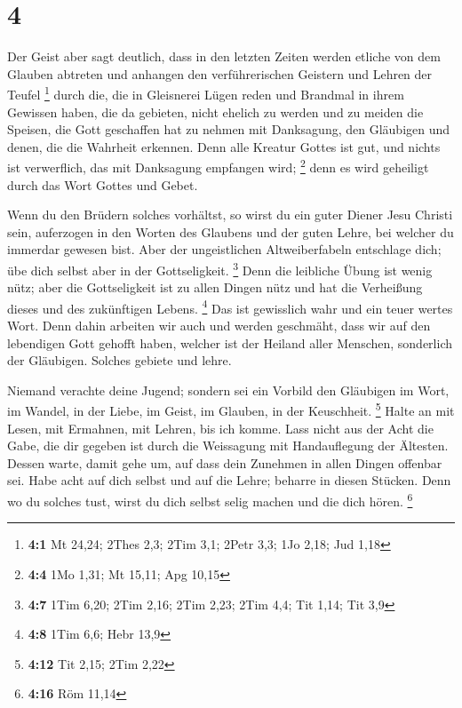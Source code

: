 \hypertarget{section-3}{%
\section{4}\label{section-3}}

 Der Geist aber sagt deutlich, dass in den letzten Zeiten
werden etliche von dem Glauben abtreten und anhangen den verführerischen
Geistern und Lehren der Teufel \footnote{\textbf{4:1} Mt 24,24; 2Thes
  2,3; 2Tim 3,1; 2Petr 3,3; 1Jo 2,18; Jud 1,18}  durch
die, die in Gleisnerei Lügen reden und Brandmal in ihrem Gewissen haben,
 die da gebieten, nicht ehelich zu werden und zu meiden
die Speisen, die Gott geschaffen hat zu nehmen mit Danksagung, den
Gläubigen und denen, die die Wahrheit erkennen.  Denn alle
Kreatur Gottes ist gut, und nichts ist verwerflich, das mit Danksagung
empfangen wird; \footnote{\textbf{4:4} 1Mo 1,31; Mt 15,11; Apg 10,15}
 denn es wird geheiligt durch das Wort Gottes und Gebet.

 Wenn du den Brüdern solches vorhältst, so wirst du ein
guter Diener Jesu Christi sein, auferzogen in den Worten des Glaubens
und der guten Lehre, bei welcher du immerdar gewesen bist.
 Aber der ungeistlichen Altweiberfabeln entschlage dich;
übe dich selbst aber in der Gottseligkeit. \footnote{\textbf{4:7} 1Tim
  6,20; 2Tim 2,16; 2Tim 2,23; 2Tim 4,4; Tit 1,14; Tit 3,9}
 Denn die leibliche Übung ist wenig nütz; aber die
Gottseligkeit ist zu allen Dingen nütz und hat die Verheißung dieses und
des zukünftigen Lebens. \footnote{\textbf{4:8} 1Tim 6,6; Hebr 13,9}
 Das ist gewisslich wahr und ein teuer wertes Wort.
 Denn dahin arbeiten wir auch und werden geschmäht, dass
wir auf den lebendigen Gott gehofft haben, welcher ist der Heiland aller
Menschen, sonderlich der Gläubigen.  Solches gebiete und
lehre.

 Niemand verachte deine Jugend; sondern sei ein Vorbild
den Gläubigen im Wort, im Wandel, in der Liebe, im Geist, im Glauben, in
der Keuschheit. \footnote{\textbf{4:12} Tit 2,15; 2Tim 2,22}
 Halte an mit Lesen, mit Ermahnen, mit Lehren, bis ich
komme.  Lass nicht aus der Acht die Gabe, die dir gegeben
ist durch die Weissagung mit Handauflegung der Ältesten. 
Dessen warte, damit gehe um, auf dass dein Zunehmen in allen Dingen
offenbar sei.  Habe acht auf dich selbst und auf die
Lehre; beharre in diesen Stücken. Denn wo du solches tust, wirst du dich
selbst selig machen und die dich hören. \footnote{\textbf{4:16} Röm
  11,14}

